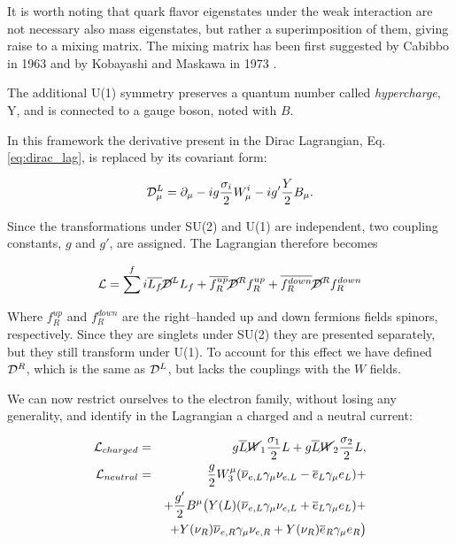 It is worth noting that quark flavor eigenstates under the weak interaction are not necessary also mass eigenstates, but rather a superimposition of them, giving raise to a mixing matrix. The mixing matrix has been first suggested by Cabibbo in 1963 \cite{Cabibbo:1963yz} and by Kobayashi and Maskawa in 1973 \cite{Kobayashi:1973fv}.

The additional U(1) symmetry preserves a quantum number called \emph{hypercharge}, Y, and is connected to a gauge boson, noted with $B$. 

In this framework the derivative present in the Dirac Lagrangian, Eq. \ref{eq:dirac_lag}, is replaced by its covariant form:

\begin{equation}
\mathcal{D}^L_\mu = \partial_\mu - ig\dfrac{\sigma_i}{2}W^i_\mu - ig'\dfrac{Y}{2}B_\mu.
\end{equation}

Since the transformations under SU(2) and U(1) are independent, two coupling constants, $g$ and $g'$, are assigned. The Lagrangian therefore becomes

\begin{equation}
\mathcal{L} = \sum^f i \overline{L_f}\cancel{\mathcal{D}}^LL_f + \overline{f^{up}_R}\cancel{\mathcal{D}}^Rf^{up}_R  + \overline{f^{down}_R}\cancel{\mathcal{D}}^Rf^{down}_R 
\end{equation}

Where $f^{up}_R$ and $f^{down}_R$ are the right--handed up and down fermions fields spinors, respectively. Since they are singlets under SU(2) they are presented separately, but they still transform under U(1). To account for this effect we have defined $\mathcal{D}^R$, which is the same as $\mathcal{D}^L$, but lacks the couplings with the $W$ fields. 

We can now restrict ourselves to the electron family, without losing any generality, and identify in the Lagrangian a charged and a neutral current:

\begin{eqnarray}
\mathcal{L}_{charged} &=& g \overline{L} \cancel{W}_1 \dfrac{\sigma_1}{2}L + g \overline{L} \cancel{W}_2 \dfrac{\sigma_2}{2}L, \\ 
\mathcal{L}_{neutral} &=& \dfrac{g}{2} W_3^\mu (\overline{\nu}_{e,L}\gamma_\mu\nu_{e,L} - \overline{e}_L\gamma_\mu e_L) +  \nonumber \\
& & + \dfrac{g'}{2} B^\mu \mathbf{\big(} Y(L) ( \overline{\nu}_{e,L}\gamma_\mu\nu_{e,L} + \overline{e}_L\gamma_\mu e_L ) + \nonumber \\
& & + Y(\nu_R) \overline{\nu}_{e,R}\gamma_\mu\nu_{e,R} + Y(\nu_R)  \overline{e}_R\gamma_\mu e_R \mathbf{\big)}
\end{eqnarray}

